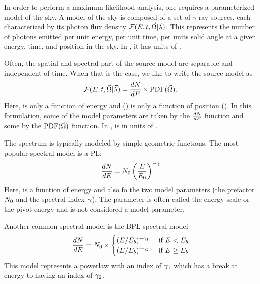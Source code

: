 
In order to perform a maximum-likelihood analysis, one requires
a parameterized model of the sky. A model of the sky
is composed of a set of $\gamma$-ray sources,
each characterized by its photon flux density 
  $\mathcal{F}(E,t,\vec\Omega|\vec\lambda)$.
This represents
the number of photons emitted per unit energy, per unit
time, per units solid angle
at a given energy, time, and position in the sky.
In , it has units of \fluxdensityunits.

Often, the spatial and spectral part of the source model
are separable and independent of time. When that is the case,
we like to write the source model as
\begin{equation}
  \mathcal{F}(E,t,\vec\Omega|\vec\lambda) = \frac{dN}{dE} \times \text{PDF}(\vec\Omega).
\end{equation}
Here, \dnde is only a function of energy and \pdf(\solidangle) is only
a function of position (\solidangle).  In this formulation, some of the
model parameters \modelparams are taken by the $\frac{dN}{dE}$ function and some
by the $\text{PDF}(\vec\Omega)$ function.
In , \dnde is in units of \prefunits.

The spectrum \dnde is typically modeled by simple geometric functions.
The most popular spectral model is a \ac{PL}:
\begin{equation}
  \frac{dN}{dE} = N_0 \left(\frac{E}{E_0}\right)^{-\gamma}
\end{equation}
Here, \dnde is a function of energy and also fo the two model parameters
(the prefactor $N_0$ and the spectral index $\gamma$). The
parameter \Escale is often called the energy scale or the pivot
energy and is not considered a model parameter.

Another common spectral model is the \ac{BPL} spectral model
\begin{equation}
  \frac{dN}{dE} = N_0 \times
    \begin{cases}
      (E/E_b)^{-\gamma_1} &\text{ if }E<E_b \\
      (E/E_b)^{-\gamma_2} &\text{ if }E\ge E_b
    \end{cases}
\end{equation}
This model represents a powerlaw with an index 
of $\gamma_1$ which has a break at energy \Ebreak
to having an index of $\gamma_2$.

